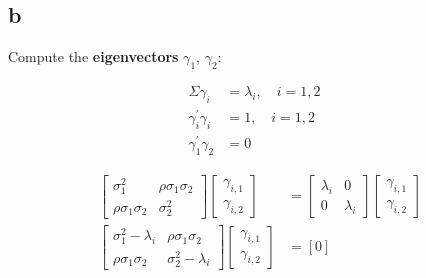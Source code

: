 \subsection{b} 
\label{section_1_b}
Compute  the \textbf{eigenvectors} $\gamma_1$, $\gamma_2$:

\begin{equation}
\nonumber
\begin{aligned}
\Sigma\gamma_i & = \lambda_i, \quad i = 1,2 &\\
\gamma_i^{\prime}\gamma_i & = 1, \quad i = 1,2 & \\
\gamma_1^{\prime}\gamma_2 & = 0 &
\end{aligned}
\end{equation}

\begin{solution}

\begin{equation}
\label{eq:1.1.b:eigenvectors}
\begin{aligned}
\left[\begin{array}{cc} \sigma_{1}^2  &  \rho\sigma_{1}\sigma_{2} \\  
                                   \rho\sigma_{1}\sigma_{2}   & \sigma_{2}^2  \end{array}\right] 
\left[\begin{array}{c} \gamma_{i,1} \\ \gamma_{i,2} \end{array}\right] &= \left[\begin{array}{cc} \lambda_i & 0 \\  0 & \lambda_i \end{array}\right] \left[\begin{array}{c} \gamma_{i,1} \\ \gamma_{i,2} \end{array}\right]\\
\left[\begin{array}{cc} \sigma_{1}^2  -\lambda_i &  \rho\sigma_{1}\sigma_{2} \\  
                                   \rho\sigma_{1}\sigma_{2}   & \sigma_{2}^2   -\lambda_i \end{array}\right] 
\left[\begin{array}{c} \gamma_{i,1} \\ \gamma_{i,2} \end{array}\right] & = \left[0\right]
\end{aligned}
\end{equation}



\end{solution}
